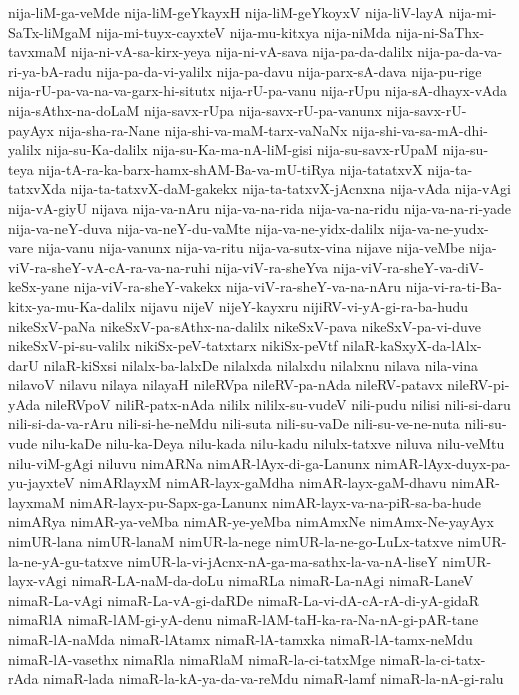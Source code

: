 {nija-liM-ga-veMde
nija-liM-geYkayxH
nija-liM-geYkoyxV
nija-liV-layA
nija-mi-SaTx-liMgaM
nija-mi-tuyx-cayxteV
nija-mu-kitxya
nija-niMda
nija-ni-SaThx-tavxmaM
nija-ni-vA-sa-kirx-yeya
nija-ni-vA-sava
nija-pa-da-dalilx
nija-pa-da-va-ri-ya-bA-radu
nija-pa-da-vi-yalilx
nija-pa-davu
nija-parx-sA-dava
nija-pu-rige
nija-rU-pa-va-na-va-garx-hi-situtx
nija-rU-pa-vanu
nija-rUpu
nija-sA-dhayx-vAda
nija-sAthx-na-doLaM
nija-savx-rUpa
nija-savx-rU-pa-vanunx
nija-savx-rU-payAyx
nija-sha-ra-Nane
nija-shi-va-maM-tarx-vaNaNx
nija-shi-va-sa-mA-dhi-yalilx
nija-su-Ka-dalilx
nija-su-Ka-ma-nA-liM-gisi
nija-su-savx-rUpaM
nija-su-teya
nija-tA-ra-ka-barx-hamx-shAM-Ba-va-mU-tiRya
nija-tatatxvX
nija-ta-tatxvXda
nija-ta-tatxvX-daM-gakekx
nija-ta-tatxvX-jAcnxna
nija-vAda
nija-vAgi
nija-vA-giyU
nijava
nija-va-nAru
nija-va-na-rida
nija-va-na-ridu
nija-va-na-ri-yade
nija-va-neY-duva
nija-va-neY-du-vaMte
nija-va-ne-yidx-dalilx
nija-va-ne-yudx-vare
nija-vanu
nija-vanunx
nija-va-ritu
nija-va-sutx-vina
nijave
nija-veMbe
nija-viV-ra-sheY-vA-cA-ra-va-na-ruhi
nija-viV-ra-sheYva
nija-viV-ra-sheY-va-diV-keSx-yane
nija-viV-ra-sheY-vakekx
nija-viV-ra-sheY-va-na-nAru
nija-vi-ra-ti-Ba-kitx-ya-mu-Ka-dalilx
nijavu
nijeV
nijeY-kayxru
nijiRV-vi-yA-gi-ra-ba-hudu
nikeSxV-paNa
nikeSxV-pa-sAthx-na-dalilx
nikeSxV-pava
nikeSxV-pa-vi-duve
nikeSxV-pi-su-valilx
nikiSx-peV-tatxtarx
nikiSx-peVtf
nilaR-kaSxyX-da-lAlx-darU
nilaR-kiSxsi
nilalx-ba-lalxDe
nilalxda
nilalxdu
nilalxnu
nilava
nila-vina
nilavoV
nilavu
nilaya
nilayaH
nileRVpa
nileRV-pa-nAda
nileRV-patavx
nileRV-pi-yAda
nileRVpoV
niliR-patx-nAda
nililx
nililx-su-vudeV
nili-pudu
nilisi
nili-si-daru
nili-si-da-va-rAru
nili-si-he-neMdu
nili-suta
nili-su-vaDe
nili-su-ve-ne-nuta
nili-su-vude
nilu-kaDe
nilu-ka-Deya
nilu-kada
nilu-kadu
nilulx-tatxve
niluva
nilu-veMtu
nilu-viM-gAgi
niluvu
nimARNa
nimAR-lAyx-di-ga-Lanunx
nimAR-lAyx-duyx-pa-yu-jayxteV
nimARlayxM
nimAR-layx-gaMdha
nimAR-layx-gaM-dhavu
nimAR-layxmaM
nimAR-layx-pu-Sapx-ga-Lanunx
nimAR-layx-va-na-piR-sa-ba-hude
nimARya
nimAR-ya-veMba
nimAR-ye-yeMba
nimAmxNe
nimAmx-Ne-yayAyx
nimUR-lana
nimUR-lanaM
nimUR-la-nege
nimUR-la-ne-go-LuLx-tatxve
nimUR-la-ne-yA-gu-tatxve
nimUR-la-vi-jAcnx-nA-ga-ma-sathx-la-va-nA-liseY
nimUR-layx-vAgi
nimaR-LA-naM-da-doLu
nimaRLa
nimaR-La-nAgi
nimaR-LaneV
nimaR-La-vAgi
nimaR-La-vA-gi-daRDe
nimaR-La-vi-dA-cA-rA-di-yA-gidaR
nimaRlA
nimaR-lAM-gi-yA-denu
nimaR-lAM-taH-ka-ra-Na-nA-gi-pAR-tane
nimaR-lA-naMda
nimaR-lAtamx
nimaR-lA-tamxka
nimaR-lA-tamx-neMdu
nimaR-lA-vasethx
nimaRla
nimaRlaM
nimaR-la-ci-tatxMge
nimaR-la-ci-tatx-rAda
nimaR-lada
nimaR-la-kA-ya-da-va-reMdu
nimaR-lamf
nimaR-la-nA-gi-ralu
}
